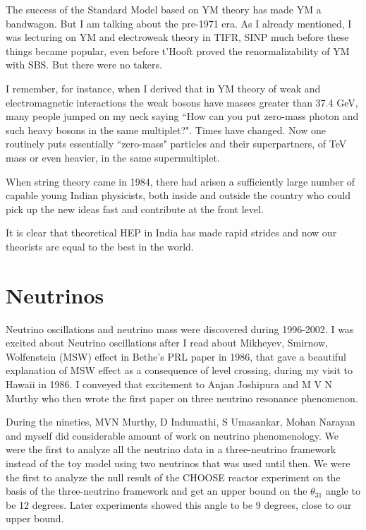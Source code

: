 The success of the Standard Model based on YM theory has made YM a 
bandwagon. But I am talking about the pre-1971 era. As I already 
mentioned, I was lecturing on YM and electroweak theory in TIFR, SINP 
much before these things became popular, even before t'Hooft proved the 
renormalizability of YM with SBS. But there were no takers.

I remember, for instance, when I derived that in YM theory of weak and 
electromagnetic interactions the weak bosons have masses greater than 
37.4 GeV, many people jumped on my neck saying ``How can you put 
zero-mass photon and such heavy bosons in the same multiplet?". Times 
have changed. Now one routinely puts essentially ``zero-mass" particles 
and their superpartners, of TeV mass or even heavier, in the same 
supermultiplet.

When string theory came in 1984, there had arisen a suffici\-ently large 
number of capable young Indian physicists, both inside and outside the 
country who could pick up the new ideas fast and contribute at the front 
level.

It is clear that theoretical HEP in India has made rapid strides and now 
our theorists are equal to the best in the world.

\vspace{-.4cm}
\section*{Neutrinos}

\vspace{-.2cm}

Neutrino oscillations and neutrino mass were discovered during 
1996-2002. I was excited about Neutrino oscillations after I read about 
Mikheyev, Smirnow, Wolfenstein (MSW) effect in Bethe's PRL paper in 1986, 
that gave a beautiful explanation of MSW effe\-ct as a consequence of 
level crossing, during my visit to Hawaii in 1986. I conveyed that 
excitement to Anjan Joshipura and M V N Murthy who then wrote the first 
paper on three neutrino resonance phenomenon.

During the nineties,  MVN Murthy, D Indumathi, S Umasan\-kar, 
Mohan Narayan and myself did considerable amount of work on neutrino 
phenomenology. We were the first to analyze all the neutrino data in a 
three-neutrino framework instead of the toy model using two neutrinos 
that was used until then. We were the first to analyze the null result 
of the CHOOSE reactor experi\-ment on the basis of the three-neutrino 
framework and get an upper bound on the $\theta_{31}$ angle to be 12 degrees. 
Later experiments showed this angle to be 9 degrees, close to our upper 
bound.

